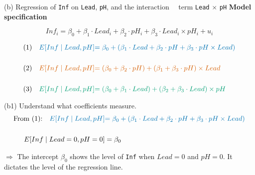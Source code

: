 \documentclass[
  10pt,
  ignorenonframetext,
]{beamer}
\begin{document}
\begin{frame}{(b) Regression of \texttt{Inf} on \texttt{Lead},
\texttt{pH}, and the interaction ~~term \texttt{Lead} \(\times\)
\texttt{pH}}
\protect\hypertarget{b-regression-of-inf-on-lead-ph-and-the-interaction-term-lead-times-ph}{}
\textbf{Model specification}

\[
Inf_i = \beta_0 + \beta_1\cdot Lead_i + \beta_2 \cdot pH_i + \beta_3 \cdot Lead_i \times pH_i + u_i
\]

\[
\begin{aligned}
(1)\quad \color{blue}{E[Inf \mid Lead, pH]} &\color{blue}{= \beta_0 + (\beta_1 \cdot Lead + \beta_2 \cdot pH + \beta_3 \cdot pH \times Lead)}\\
\\
(2)\quad \color{red}{E[Inf \mid Lead, pH]} &\color{red}{= (\beta_0 + \beta_2 \cdot pH) + (\beta_1 + \beta_3 \cdot pH) \times Lead}\\
\\
(3)\quad \color{green}{E[Inf \mid Lead, pH]} &\color{green}{= (\beta_0 + \beta_1 \cdot Lead) + (\beta_2 + \beta_3 \cdot Lead) \times pH}
\end{aligned}
\]
\end{frame}

\begin{frame}[fragile]{(b1) Understand what coefficients measure.}
\protect\hypertarget{b1-understand-what-coefficients-measure.}{}
\[
\begin{aligned}
\text{From (1):} \quad  \color{blue}{E[Inf \mid Lead, pH]} &\color{blue}{= \beta_0 + (\beta_1 \cdot Lead + \beta_2 \cdot pH + \beta_3 \cdot pH \times Lead)}\\
\\
E[Inf \mid Lead = 0, pH = 0] &= \beta_0\\
\end{aligned}
\]

\(\Rightarrow\) The intercept \(\beta_0\) shows the level of
\texttt{Inf} when \(Lead = 0\) and \(pH = 0\). It dictates the level of
the regression line.
\end{frame}
\end{document}

